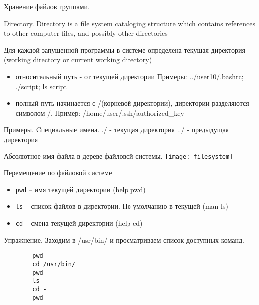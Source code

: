 \begin{frame}[fragile]{Хранение файлов группами.}
      \begin{block}{Directory.}
Directory is a file system cataloging structure which contains references to other computer \alert{files}, and possibly other \alert{directories}
      \end{block}
 Для каждой запущенной программы в системе определена \alert{текущая директория} (working directory or current working directory) 
  \begin{itemize}
    \item \alert{относительный путь} - от текущей директории \newline
      Примеры: ../user10/.bashrc; ./script; ls script
    \item \alert{полный путь} начинается с \alert{/}(корневой директории), директории разделяются символом \alert{/}. \newline
      Пример: /home/user/.ssh/authorized\_key
  \end{itemize}

      \begin{block}{Примеры. Cпециальные имена.}
        \alert{./} - текущая директория
        \alert{../} - предыдущая директория
      \end{block}
\end{frame}

\begin{frame}{Абсолютное имя файла в дереве файловой системы.}
\texttt{[image: filesystem]} 
\end{frame}

\begin{frame}[fragile]{Перемещение по файловой системе}
      \begin{itemize}
		  \item {\tt pwd} -- имя текущей директории (help pwd)
		  \item {\tt ls} -- список файлов в директории. По умолчанию в текущей (man ls)
		  \item {\tt cd} -- смена текущей директории (help cd)
      \end{itemize}
      \begin{block}{Упражнение. Заходим в /usr/bin/ и просматриваем список доступных команд.}
	\begin{lstlisting}
        pwd
        cd /usr/bin/
        pwd
        ls
        cd -
        pwd
\end{lstlisting}
      \end{block}
\end{frame}

